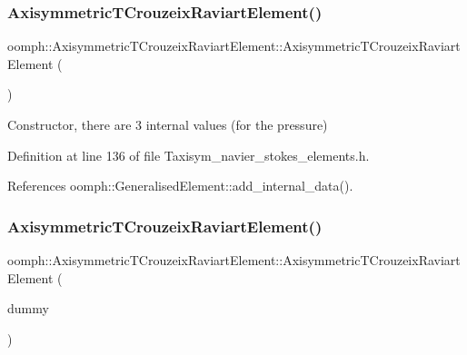 \subsubsection{\texorpdfstring{Axisymmetric\+T\+Crouzeix\+Raviart\+Element()}{AxisymmetricTCrouzeixRaviartElement()}\hspace{0.1cm}{\footnotesize\ttfamily [1/2]}}
{\footnotesize\ttfamily oomph\+::\+Axisymmetric\+T\+Crouzeix\+Raviart\+Element\+::\+Axisymmetric\+T\+Crouzeix\+Raviart\+Element (\begin{DoxyParamCaption}{ }\end{DoxyParamCaption})\hspace{0.3cm}{\ttfamily [inline]}}



Constructor, there are 3 internal values (for the pressure) 



Definition at line 136 of file Taxisym\+\_\+navier\+\_\+stokes\+\_\+elements.\+h.



References oomph\+::\+Generalised\+Element\+::add\+\_\+internal\+\_\+data().

\mbox{\label{classoomph_1_1AxisymmetricTCrouzeixRaviartElement_abf77290ac8634231d0cbe1f2058d29ea}} 
\subsubsection{\texorpdfstring{Axisymmetric\+T\+Crouzeix\+Raviart\+Element()}{AxisymmetricTCrouzeixRaviartElement()}\hspace{0.1cm}{\footnotesize\ttfamily [2/2]}}
{\footnotesize\ttfamily oomph\+::\+Axisymmetric\+T\+Crouzeix\+Raviart\+Element\+::\+Axisymmetric\+T\+Crouzeix\+Raviart\+Element (\begin{DoxyParamCaption}\item[{const \hyperlink{classoomph_1_1AxisymmetricTCrouzeixRaviartElement}{Axisymmetric\+T\+Crouzeix\+Raviart\+Element} \&}]{dummy }\end{DoxyParamCaption})\hspace{0.3cm}{\ttfamily [inline]}}



